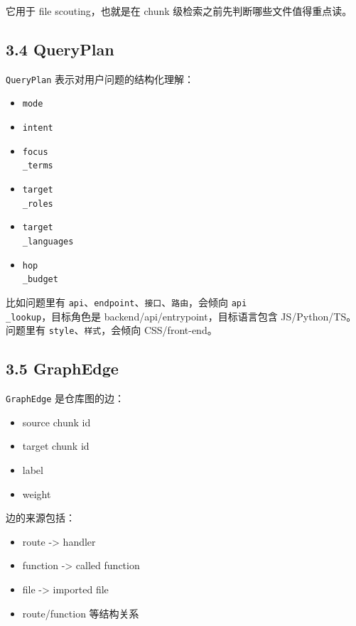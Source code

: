 \documentclass[UTF8,12pt,openany]{ctexbook}
\begin{document}
它用于 file scouting，也就是在 chunk 级检索之前先判断哪些文件值得重点读。\par

\subsection{3.4 QueryPlan}

\texttt{QueryPlan} 表示对用户问题的结构化理解：\par

\begin{itemize}
\item \texttt{mode}
\item \texttt{intent}
\item \texttt{focus\\_terms}
\item \texttt{target\\_roles}
\item \texttt{target\\_languages}
\item \texttt{hop\\_budget}
\end{itemize}

比如问题里有 \texttt{api}、\texttt{endpoint}、\texttt{接口}、\texttt{路由}，会倾向 \texttt{api\\_lookup}，目标角色是 backend/api/entrypoint，目标语言包含 JS/Python/TS。问题里有 \texttt{style}、\texttt{样式}，会倾向 CSS/front-end。\par

\subsection{3.5 GraphEdge}

\texttt{GraphEdge} 是仓库图的边：\par

\begin{itemize}
\item source chunk id
\item target chunk id
\item label
\item weight
\end{itemize}

边的来源包括：\par

\begin{itemize}
\item route -> handler
\item function -> called function
\item file -> imported file
\item route/function 等结构关系
\end{itemize}
\end{document}
